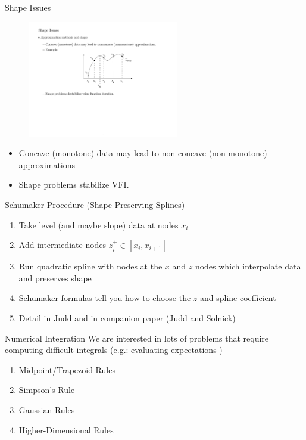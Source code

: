 \documentclass[xcolor=pdftex,dvipsnames,table,mathserif,aspectratio=169]{beamer}
\begin{document}
\begin{frame}{Shape Issues}
\begin{figure}[htbp]
\begin{center}
\includegraphics[height=2in]{./resources/spline.pdf}
\label{default}
\end{center}
\end{figure}
\begin{itemize}
\item Concave (monotone) data may lead to non concave (non monotone) approximations
\item Shape problems stabilize VFI.
\end{itemize}
\end{frame}

\begin{frame}{Schumaker Procedure (Shape Preserving Splines)}
\begin{enumerate}
\item Take level (and maybe slope) data at nodes $x_i$
\item Add intermediate nodes $z_i^{+} \in [x_i,x_{i+1}]$
\item Run quadratic spline with nodes at the $x$ and $z$ nodes which interpolate data and preserves shape
\item Schumaker formulas tell you how to choose the $z$ and spline coefficient
\item Detail in Judd and in companion paper (Judd and Solnick)
\end{enumerate}
\end{frame}


\begin{frame}{Numerical Integration}
We are interested in lots of problems that require computing difficult integrals (e.g.: evaluating expectations )
\begin{enumerate}
\item Midpoint/Trapezoid Rules
\item Simpson's Rule
\item Gaussian Rules
\item Higher-Dimensional Rules
\end{enumerate}
\end{frame}
\end{document}
